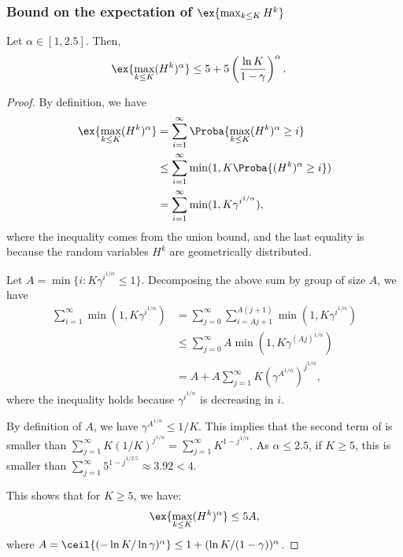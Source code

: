 \begin{subappendices}
\subsubsection{Bound on the expectation of $\ex{\max_{k\le K}H^k}$}

\begin{lem}
    \label{lem:moment}
    Let $\alpha\in[1,2.5]$. Then,
    \begin{align}
        \label{eq:lemma_HK}
        \ex{\max_{k\le K}(H^k)^\alpha} &\le 5+5\left(\frac{\ln K}{1-\gamma}\right)^\alpha.
    \end{align}
 \end{lem}
 \begin{proof}
    By definition, we have
    \begin{align*}
        \ex{\max_{k\le K}(H^k)^\alpha} &=  \sum_{i=1}^\infty \Proba{ \max_{k\le K}(H^k)^\alpha \ge i}\\
        &\le \sum_{i=1}^\infty \min(1, K \Proba{ (H^k)^\alpha \ge i})\\
        &= \sum_{i=1}^\infty \min(1, K \gamma^{i^{1/\alpha}}),
    \end{align*}
    where the inequality comes from the union bound, and the last equality is because the random variables $H^k$ are geometrically distributed.
 
    Let $A=\min\{i : K \gamma^{i^{1/\alpha}}\le 1\}$. Decomposing the above sum by group of size $A$, we have
    \begin{align}
        \sum_{i=1}^\infty \min(1, K \gamma^{i^{1/\alpha}})
        &= \sum_{j=0}^\infty \sum_{i=Aj+1}^{A(j+1)}\min(1, K \gamma^{i^{1/\alpha}})\nonumber\\
        &\le \sum_{j=0}^\infty A \min(1, K \gamma^{(Aj)^{1/\alpha}})\nonumber\\
        &= A + A\sum_{j=1}^\infty K (\gamma^{A^{1/\alpha}})^{j^{1/\alpha}},
        \label{eq:sum_A}
    \end{align}
    where the inequality holds because $\gamma^{i^{1/\alpha}}$ is decreasing in $i$. 
 
    By definition of $A$, we have $\gamma^{A^{1/\alpha}}\le 1/K$. This implies that the second term of  is smaller than $\sum_{j=1}^\infty K (1/K)^{j^{1/\alpha}}=\sum_{j=1}^\infty K^{1-j^{1/\alpha}}$. As $\alpha\le 2.5$, if  $K\ge5$, this is smaller than $\sum_{j=1}^\infty 5^{1-j^{1/2.5}}\approx 3.92<4$.
 
    This shows that for $K\ge5$, we have:
    \begin{align*}
        \ex{\max_{k\le K}(H^k)^\alpha} \le 5A,
    \end{align*}
    where $A=\ceil{(-\ln K/\ln \gamma)^{\alpha}}\le 1+(\ln K/(1-\gamma ))^\alpha$.
 

\end{proof}
\end{subappendices}
